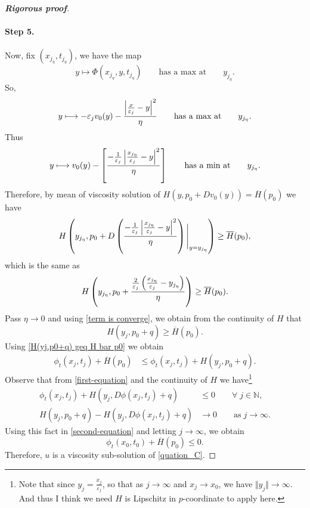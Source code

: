 \documentclass[12pt, oneside]{amsart}  	%
\begin{document}
\begin{proof}[\textbf{Rigorous proof}]
\paragraph{\textbf{Step 5.}}	 Now, fix $(x_{j_\eta}, t_{j_\eta})$, we have the map
\begin{equation*}
y\longmapsto \Phi(x_{j_\eta}, y, t_{j_\eta})\qquad\text{has a max at}\qquad y_{j_\eta}.
\end{equation*}
So,
\begin{equation*}
y\longmapsto -\varepsilon_j v_0(y) - \frac{\left|\frac{x}{\varepsilon_j} - y\right|^2}{\eta}\qquad\text{has a max at}\qquad y_{j_\eta}.
\end{equation*}
Thus
\begin{equation*}
y\longmapsto  v_0(y) - \left[\frac{-\frac{1}{\varepsilon_j}\left|\frac{x_{j_\eta}}{\varepsilon_j} - y\right|^2}{\eta}\right]\qquad\text{has a min at}\qquad y_{j_\eta}.
\end{equation*}
Therefore, by mean of viscosity solution of $H(y,p_0+Dv_0(y)) = \overline{H}(p_0)$ we have
\begin{equation*}
H\left(y_{j_\eta}, p_0 + D\left(\frac{ -\frac{1}{\varepsilon_j} \left|\frac{x_{j_\eta}}{\varepsilon_j} - y\right|^2}{\eta}\right)\Bigg|_{y = y_{j_\eta}}\right) \geq \overline{H}(p_0),
\end{equation*}
which is the same as
\begin{equation*}
 H\left(y_{j_\eta}, p_0 +\frac{\frac{2}{\varepsilon_j}\left(\frac{x_{j_\eta}}{\varepsilon_j} - y_{j_\eta}\right)}{\eta} \right) \geq \overline{H}(p_0).
\end{equation*}
Pass $\eta \longrightarrow 0$ and using \eqref{term is converge}, we obtain from the continuity of $H$ that
\begin{equation}\label{H(yj,p0+q) geq H bar p0}
H\left(y_j, p_0+ q\right)\geq \overline{H}(p_0).
\end{equation}
Using \eqref{H(yj,p0+q) geq H bar p0} we obtain %
\begin{align}\label{second-equation}
\phi_t\left(x_j,t_j\right) + \overline{H}(p_0) &\leq \phi_t\left(x_j,t_j\right) + H\left(y_j,p_0 + q\right).
\end{align}
Observe that from \eqref{first-equation} and the continuity of $H$ we have\footnote{Note that since $y_j = \frac{x_j}{\varepsilon_j}$, so that as $j\longrightarrow\infty$ and $x_j\longrightarrow x_0$, we have $\Vert y_j\Vert\longrightarrow \infty$. And thus I think we need $H$ is Lipschitz in $p$-coordinate to apply here.}
\begin{align*}
\phi_t(x_j,t_j) + H(y_j,D\phi(x_j,t_j) + q) &\leq 0 \qquad\forall\; j\in \mathbb{N},\\
H\left(y_j,p_0 + q\right) - H(y_j,D\phi(x_j,t_j) + q) &\longrightarrow 0 \qquad\text{as}\;j\longrightarrow\infty.
\end{align*}
Using this fact in \eqref{second-equation} and letting $j\longrightarrow \infty$, we obtain 
\begin{equation*}
\phi_t(x_0,t_0) + \overline{H}(p_0) \leq 0.
\end{equation*}
Therefore, $u$ is a viscosity sub-solution of \eqref{quation_C}.
\end{proof}
\end{document}
